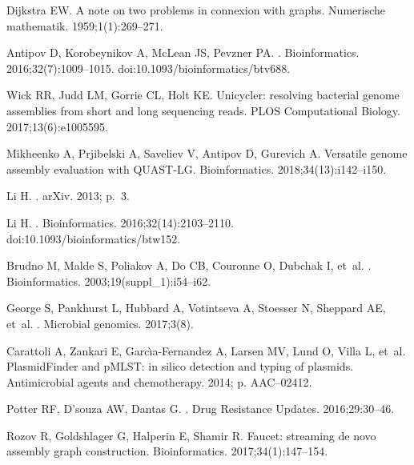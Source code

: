\documentclass[10pt,letterpaper]{article}
\begin{document}
\begin{thebibliography}{10}
Dijkstra EW.
\newblock A note on two problems in connexion with graphs.
\newblock Numerische mathematik. 1959;1(1):269--271.

Antipov D, Korobeynikov A, McLean JS, Pevzner PA.
.
\newblock Bioinformatics. 2016;32(7):1009--1015.
\newblock doi:{10.1093/bioinformatics/btv688}.

Wick RR, Judd LM, Gorrie CL, Holt KE.
\newblock Unicycler: resolving bacterial genome assemblies from short and long
  sequencing reads.
\newblock PLOS Computational Biology. 2017;13(6):e1005595.

Mikheenko A, Prjibelski A, Saveliev V, Antipov D, Gurevich A.
\newblock Versatile genome assembly evaluation with {QUAST-LG}.
\newblock Bioinformatics. 2018;34(13):i142--i150.

Li H.
.
\newblock arXiv. 2013; p.~3.

Li H.
.
\newblock Bioinformatics. 2016;32(14):2103--2110.
\newblock doi:{10.1093/bioinformatics/btw152}.

Brudno M, Malde S, Poliakov A, Do CB, Couronne O, Dubchak I, et~al.
.
\newblock Bioinformatics. 2003;19(suppl\_1):i54--i62.

George S, Pankhurst L, Hubbard A, Votintseva A, Stoesser N, Sheppard AE, et~al.
.
\newblock Microbial genomics. 2017;3(8).

Carattoli A, Zankari E, Garc{\`\i}a-Fernandez A, Larsen MV, Lund O, Villa L,
  et~al.
\newblock PlasmidFinder and pMLST: in silico detection and typing of plasmids.
\newblock Antimicrobial agents and chemotherapy. 2014; p. AAC--02412.

Potter RF, D’souza AW, Dantas G.
.
\newblock Drug Resistance Updates. 2016;29:30--46.

Rozov R, Goldshlager G, Halperin E, Shamir R.
\newblock Faucet: streaming de novo assembly graph construction.
\newblock Bioinformatics. 2017;34(1):147--154.


\end{thebibliography}
\end{document}
